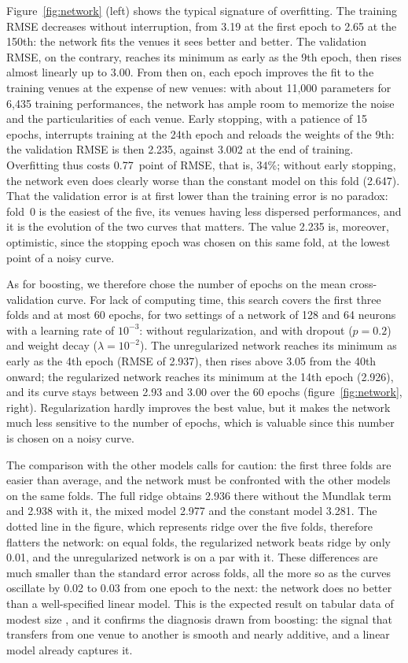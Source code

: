 \documentclass[11pt,a4paper]{article}
\begin{document}
Figure~\ref{fig:network} (left) shows the typical signature of overfitting. The training RMSE decreases without
interruption, from 3.19 at the first epoch to 2.65 at the 150th: the network fits the venues it sees better and better.
The validation RMSE, on the contrary, reaches its minimum as early as the 9th epoch, then rises almost linearly up to
3.00. From then on, each epoch improves the fit to the training venues at the expense of new venues: with about 11,000
parameters for 6,435 training performances, the network has ample room to memorize the noise and the particularities
of each venue. Early stopping, with a patience of 15 epochs, interrupts training at the 24th epoch and reloads the
weights of the 9th: the validation RMSE is then 2.235, against 3.002 at the end of training. Overfitting thus costs
0.77~point of RMSE, that is, $34$\%; without early stopping, the network even does clearly worse than the constant
model on this fold (2.647). That the validation error is at first lower than the training error is no paradox: fold~0
is the easiest of the five, its venues having less dispersed performances, and it is the evolution of the two curves
that matters. The value 2.235 is, moreover, optimistic, since the stopping epoch was chosen on this same fold, at the
lowest point of a noisy curve.

As for boosting, we therefore chose the number of epochs on the mean cross-validation curve. For lack of computing
time, this search covers the first three folds and at most 60 epochs, for two settings of a network of 128 and 64
neurons with a learning rate of $10^{-3}$: without regularization, and with dropout ($p = 0.2$) and weight decay
($\lambda = 10^{-2}$). The unregularized network reaches its minimum as early as the 4th epoch (RMSE of 2.937), then
rises above 3.05 from the 40th onward; the regularized network reaches its minimum at the 14th epoch (2.926), and its
curve stays between 2.93 and 3.00 over the 60 epochs (figure~\ref{fig:network}, right). Regularization hardly improves
the best value, but it makes the network much less sensitive to the number of epochs, which is valuable since this
number is chosen on a noisy curve.

The comparison with the other models calls for caution: the first three folds are easier than average, and the
network must be confronted with the other models on the same folds. The full ridge obtains 2.936 there without the
Mundlak term and 2.938 with it, the mixed model 2.977 and the constant model 3.281. The dotted line in the figure, which
represents ridge over the five folds, therefore flatters the network: on equal folds, the regularized network beats
ridge by only 0.01, and the unregularized network is on a par with it. These differences are much smaller than the
standard error across folds, all the more so as the curves oscillate by 0.02 to 0.03 from one epoch to the next: the
network does no better than a well-specified linear model. This is the expected result on tabular data of modest size
\citep{grinsztajn2022}, and it confirms the diagnosis drawn from boosting: the signal that transfers from one venue to
another is smooth and nearly additive, and a linear model already captures it.
\end{document}
